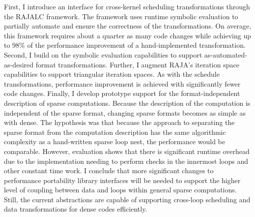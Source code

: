 First, I introduce an interface for cross-kernel scheduling transformations through the RAJALC framework.
The framework uses runtime symbolic evaluation to partially automate and ensure the correctness of the transformations.
On average, this framework requires about a quarter as many code changes while achieving up to 98\% of the performance improvement of a hand-implemented transformation.
Second, I build on the symbolic evaluation capabilities to support as-automated-as-desired format transformations.
Further, I augment RAJA's iteration space capabilities to support triangular iteration spaces.
As with the schedule transformations, performance improvement is achieved with significantly fewer code changes.
Finally, I develop prototype support for the format-independent description of sparse computations.
Because the description of the computation is independent of the sparse format, changing sparse formats becomes as simple as with dense.
The hypothesis was that because the approach to separating the sparse format from the computation description has the same algorithmic complexity as a hand-written sparse loop nest, the performance would be comparable.
However, evaluation shows that there is significant runtime overhead due to the implementation needing to perform checks in the innermost loops and other constant time work.
I conclude that more significant changes to performance portability library interfaces will be needed to support the higher level of coupling between data and loops within general sparse computations.
Still, the current abstractions are capable of supporting cross-loop scheduling and data transformations for dense codes efficiently. 



\pagestyle{thesis}